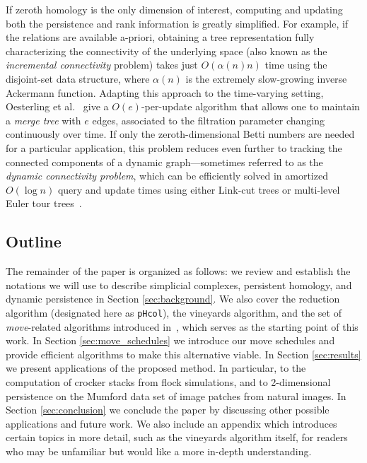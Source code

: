 \documentclass{siamart190516}
\begin{document}
If  zeroth homology is the only dimension of interest, computing and updating both the persistence and rank information  is greatly simplified. For example, if the relations are available a-priori, obtaining a tree representation fully characterizing the connectivity of the underlying space (also known as the \emph{incremental connectivity} problem) takes just $O(\alpha(n) n)$ time using the disjoint-set data structure, where $\alpha(n)$ is the extremely slow-growing inverse Ackermann function. 
Adapting this approach to the time-varying setting, Oesterling et al.~\cite{oesterling2015computing} give a $O(e)$-per-update algorithm that allows one to maintain a \emph{merge tree} with $e$ edges,
associated to the filtration parameter changing continuously over time. 
If only the zeroth-dimensional Betti numbers are needed for a particular application, this problem reduces even further to tracking the connected components of a dynamic graph---sometimes referred to as the \emph{dynamic connectivity problem}, which can be efficiently  solved in amortized $O(\log n)$ query and update times using either Link-cut trees or multi-level Euler tour trees~\cite{kapron2013dynamic}.

\subsection{Outline} The remainder of the paper is organized as follows: we review and establish the notations we will use to describe simplicial complexes, persistent homology, and dynamic persistence in Section \ref{sec:background}. 
We also cover the reduction algorithm (designated here as \texttt{pHcol}), the vineyards algorithm, and the set of \emph{move}-related algorithms introduced in~\cite{busaryev2010tracking}, which serves as the starting point of this work. 
In Section \ref{sec:move_schedules} we introduce our move schedules  and provide efficient algorithms to make this alternative viable. 
In Section \ref{sec:results} we present applications of the proposed method. 
In particular, to the computation of crocker stacks from flock simulations, and to 2-dimensional persistence on the Mumford data set of image patches from natural images. 
In Section \ref{sec:conclusion} we conclude the paper by discussing other possible applications and future work. 
We also include an appendix which introduces certain topics in more detail, such as the vineyards algorithm itself, for readers who may be unfamiliar but would like a more in-depth understanding.


\end{document}
